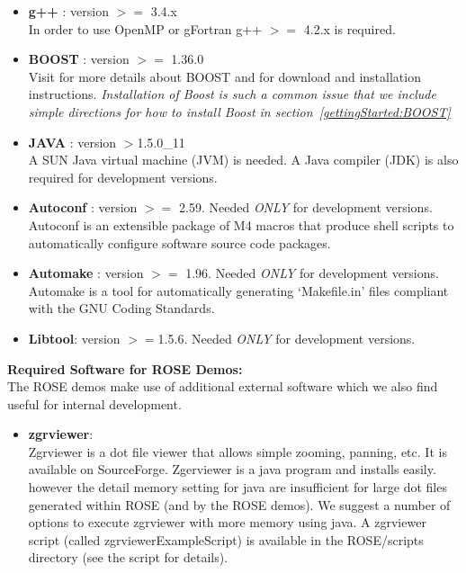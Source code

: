 \begin{itemize}
   \item {\bf g++} : version $>=$ 3.4.x  \\
     In order to use OpenMP or gFortran g++ $>=$ 4.2.x is required.

   \item {\bf BOOST} : version $>=$ 1.36.0  \\
     Visit 
     for more details about BOOST and 
     for download and installation instructions. 
     {\em Installation of Boost is such a common issue that we include simple directions for how to install Boost in section~\ref{gettingStarted:BOOST}}

   \item {\bf JAVA} : version $>$1.5.0\_11 \\
     A SUN Java virtual machine (JVM) is needed. A Java compiler (JDK) is also
     required for development versions.  

   \item {\bf Autoconf} : version $>=$ 2.59. Needed \emph{ONLY} for development versions. \\
     Autoconf is an extensible package of M4 macros that produce shell scripts to automatically configure software source code packages. 

   \item {\bf Automake} : version $>=$ 1.96. Needed \emph{ONLY} for development versions. \\
     Automake is a tool for automatically generating `Makefile.in' files compliant with
     the GNU Coding Standards.

   \item {\bf Libtool}: version $>=$1.5.6.  Needed \emph{ONLY} for development versions. 
\end{itemize}

{\bf Required Software for ROSE Demos:} \\
     The ROSE demos make use of additional external software which we also find useful for
     internal development.
\begin{itemize}
   \item {\bf zgrviewer}: \\
     Zgrviewer is a dot file viewer that allows simple zooming, panning, etc. It is
     available on SourceForge.  Zgerviewer is a java program and installs easily.
     however the detail memory setting for java are insufficient for large dot files
     generated within ROSE (and by the ROSE demos).  We suggest a number of options
     to execute zgrviewer with more memory using java.  A zgrviewer script (called
     zgrviewerExampleScript) is available in the ROSE/scripts directory (see the 
     script for details).

\end{itemize}


